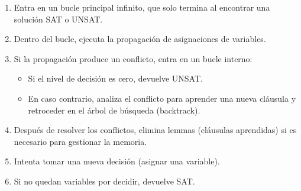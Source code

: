\begin{enumerate}
    \item Entra en un bucle principal infinito, que solo termina al encontrar una solución SAT o UNSAT.
    \item Dentro del bucle, ejecuta la propagación de asignaciones de variables.
    \item Si la propagación produce un conflicto, entra en un bucle interno:
    \begin{itemize}
        \item Si el nivel de decisión es cero, devuelve UNSAT.
        \item En caso contrario, analiza el conflicto para aprender una nueva cláusula y retroceder en el árbol de búsqueda (backtrack).
    \end{itemize}
    \item Después de resolver los conflictos, elimina lemmas (cláusulas aprendidas) si es necesario para gestionar la memoria.
    \item Intenta tomar una nueva decisión (asignar una variable).
    \item Si no quedan variables por decidir, devuelve SAT.
\end{enumerate}



